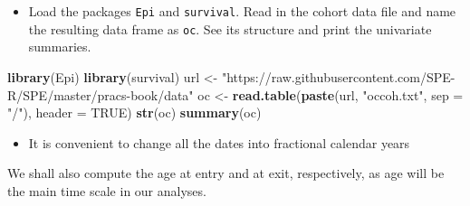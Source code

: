 \documentclass[
]{book}
\newenvironment{Shaded}{\begin{snugshade}}{\end{snugshade}}
\newcommand{\AttributeTok}[1]{\textcolor[rgb]{0.13,0.29,0.53}{#1}}
\newcommand{\ConstantTok}[1]{\textcolor[rgb]{0.56,0.35,0.01}{#1}}
\newcommand{\FunctionTok}[1]{\textcolor[rgb]{0.13,0.29,0.53}{\textbf{#1}}}
\newcommand{\NormalTok}[1]{#1}
\newcommand{\OtherTok}[1]{\textcolor[rgb]{0.56,0.35,0.01}{#1}}
\newcommand{\SpecialCharTok}[1]{\textcolor[rgb]{0.81,0.36,0.00}{\textbf{#1}}}
\newcommand{\StringTok}[1]{\textcolor[rgb]{0.31,0.60,0.02}{#1}}
\providecommand{\tightlist}{%
  \setlength{\itemsep}{0pt}\setlength{\parskip}{0pt}}
\begin{document}
\begin{itemize}
\tightlist
\item
  Load the packages \texttt{Epi} and \texttt{survival}.
  Read in the cohort data file and name
  the resulting data frame as \texttt{oc}.
  See its structure and print the univariate summaries.
\end{itemize}

\begin{Shaded}
\begin{Highlighting}[]
\FunctionTok{library}\NormalTok{(Epi)}
\FunctionTok{library}\NormalTok{(survival)}
\NormalTok{url }\OtherTok{\textless{}{-}} \StringTok{"https://raw.githubusercontent.com/SPE{-}R/SPE/master/pracs{-}book/data"}
\NormalTok{oc }\OtherTok{\textless{}{-}} \FunctionTok{read.table}\NormalTok{(}\FunctionTok{paste}\NormalTok{(url, }\StringTok{"occoh.txt"}\NormalTok{, }\AttributeTok{sep =} \StringTok{"/"}\NormalTok{), }\AttributeTok{header =} \ConstantTok{TRUE}\NormalTok{)}
\FunctionTok{str}\NormalTok{(oc)}
\FunctionTok{summary}\NormalTok{(oc)}
\end{Highlighting}
\end{Shaded}

\begin{itemize}
\tightlist
\item
  It is convenient to change all the dates into fractional calendar years
\end{itemize}

\begin{Shaded}
\end{Shaded}

We shall also compute the age at entry and at exit, respectively,
as age will be the main time scale in our analyses.

\begin{Shaded}
\end{Shaded}
\end{document}
